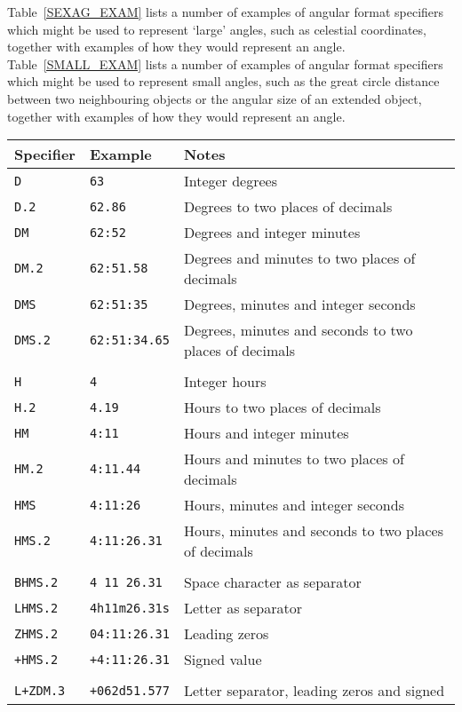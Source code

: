 \documentclass[11pt,twoside]{starlink}
\begin{document}
Table~\ref{SEXAG_EXAM} lists a number of examples of angular format
specifiers which might be used to represent `large' angles, such as
celestial coordinates, together with examples of how they would
represent an angle.  Table~\ref{SMALL_EXAM} lists a number of examples of
angular format specifiers which might be used to represent small angles,
such as the great circle distance between two neighbouring objects or the
angular size of an extended object, together with examples of how they
would represent an angle.

\begin{table}[htbp]

\begin{center}
\begin{tabular}{lll}
Specifier     & Example            & Notes          \\ \hline
\texttt{D}       & \texttt{63}          & Integer degrees \\
\texttt{D.2}     & \texttt{62.86}       & Degrees to two places of decimals \\
\texttt{DM}      & \texttt{62:52}       & Degrees and integer minutes \\
\texttt{DM.2}    & \texttt{62:51.58}    & Degrees and minutes to two places of decimals \\
\texttt{DMS}     & \texttt{62:51:35}    & Degrees, minutes and integer seconds \\
\texttt{DMS.2}   & \texttt{62:51:34.65} & Degrees, minutes and seconds to two places of decimals \\
              &                    & \\
\texttt{H}       & \texttt{4}            & Integer hours \\
\texttt{H.2}     & \texttt{4.19}         & Hours to two places of decimals \\
\texttt{HM}      & \texttt{4:11}         & Hours and integer minutes \\
\texttt{HM.2}    & \texttt{4:11.44}      & Hours and minutes to two places of decimals \\
\texttt{HMS}     & \texttt{4:11:26}      & Hours, minutes and integer seconds \\
\texttt{HMS.2}   & \texttt{4:11:26.31}   & Hours, minutes and seconds to two places of decimals \\
              &                    & \\
\texttt{BHMS.2}  & \texttt{4 11 26.31}   & Space character as separator \\
\texttt{LHMS.2}  & \texttt{4h11m26.31s}  & Letter as separator \\
\texttt{ZHMS.2}  & \texttt{04:11:26.31}  & Leading zeros \\
\texttt{+HMS.2}  & \texttt{+4:11:26.31}  & Signed value \\
              &                    & \\
\texttt{L+ZDM.3} & \texttt{+062d51.577}  & Letter separator, leading zeros and signed \\
\end{tabular}


\end{center}
\end{table}
\end{document}
